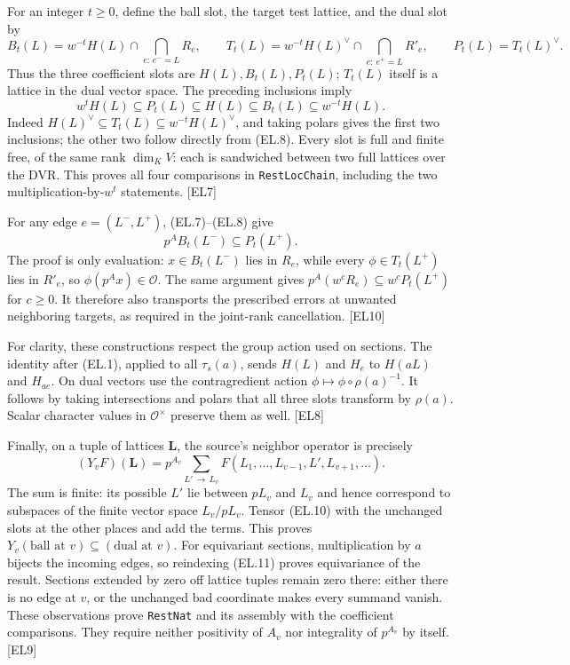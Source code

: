 \documentclass[11pt,a4paper]{article}
\numberwithin{equation}{section}
\theoremstyle{remark}\newtheorem{remark}[theorem]{Remark}
\begin{document}
For an integer $t\ge0$, define the ball slot, the target test lattice, and the dual slot by
\[
 B_t(L)=w^{-t}H(L)\cap\bigcap_{e:\,e^-=L}R_e,\qquad
 T_t(L)=w^{-t}H(L)^\vee\cap\bigcap_{e:\,e^+=L}R'_e,\qquad
 P_t(L)=T_t(L)^\vee .
 \tag{EL.8}
\]
Thus the three coefficient slots are $H(L),B_t(L),P_t(L)$;
$T_t(L)$ itself is a lattice in the dual vector space.
The preceding inclusions imply
\[
 \boxed{\quad
 w^tH(L)\subseteq P_t(L)\subseteq H(L)
       \subseteq B_t(L)\subseteq w^{-t}H(L).
 \quad}
 \tag{EL.9}
\]
Indeed $H(L)^\vee\subseteq T_t(L)\subseteq w^{-t}H(L)^\vee$, and taking polars gives the first two inclusions; the other two follow directly from (EL.8).
Every slot is full and finite free, of the same rank $\dim_K V$: each is sandwiched between two full lattices over the DVR.
This proves all four comparisons in \texttt{RestLocChain}, including the two multiplication-by-$w^t$ statements. \textsf{[EL7]}

For any edge $e=(L^-,L^+)$, (EL.7)--(EL.8) give
\[
 \boxed{\qquad p^A B_t(L^-)\subseteq P_t(L^+).\qquad}
 \tag{EL.10}
\]
The proof is only evaluation: $x\in B_t(L^-)$ lies in $R_e$, while every $\phi\in T_t(L^+)$ lies in $R'_e$, so $\phi(p^Ax)\in\mathcal O$.
The same argument gives
$p^A(w^cR_e)\subseteq w^cP_t(L^+)$ for $c\ge0$.
It therefore also transports the prescribed errors at unwanted neighboring targets, as required in the joint-rank cancellation. \textsf{[EL10]}

For clarity, these constructions respect the group action used on sections.
The identity after (EL.1), applied to all $\tau_s(a)$, sends $H(L)$ and $H_e$ to $H(aL)$ and $H_{ae}$.
On dual vectors use the contragredient action $\phi\mapsto\phi\circ\rho(a)^{-1}$.
It follows by taking intersections and polars that all three slots transform by $\rho(a)$.
Scalar character values in $\mathcal O^\times$ preserve them as well. \textsf{[EL8]}

Finally, on a tuple of lattices $\mathbf L$, the source's neighbor operator is precisely
\[
 (Y_vF)(\mathbf L)
  =p^{A_v}\sum_{L'\,\to\, L_v}
       F(L_1,\ldots,L_{v-1},L',L_{v+1},\ldots).
 \tag{EL.11}
\]
The sum is finite: its possible $L'$ lie between $pL_v$ and $L_v$ and hence correspond to subspaces of the finite vector space $L_v/pL_v$.
Tensor (EL.10) with the unchanged slots at the other places and add the terms. This proves
$Y_v(\text{ball at }v)\subseteq(\text{dual at }v)$.
For equivariant sections, multiplication by $a$ bijects the incoming edges, so reindexing (EL.11) proves equivariance of the result. Sections extended by zero off lattice tuples remain zero there: either there is no edge at $v$, or the unchanged bad coordinate makes every summand vanish.
These observations prove \texttt{RestNat} and its assembly with the coefficient comparisons. They require neither positivity of $A_v$ nor integrality of $p^{A_v}$ by itself. \textsf{[EL9]}
\end{document}

